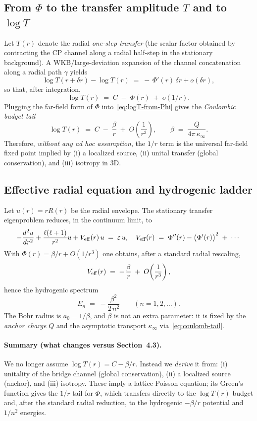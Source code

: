\documentclass[11pt]{article}
\theoremstyle{plain}
\theoremstyle{definition}
\begin{document}
\subsection{From $\Phi$ to the transfer amplitude $T$ and to \(\log T\)}
Let $T(r)$ denote the radial \emph{one-step transfer} (the scalar factor obtained by contracting the CP channel along a radial half-step in the stationary background).
A WKB/large-deviation expansion of the channel concatenation along a radial path $\gamma$ yields
\[
  \log T(r+\delta r) - \log T(r) \;=\; -\,\Phi'(r)\,\delta r + o(\delta r),
\]
so that, after integration,
\begin{equation}\label{eq:logT-from-Phi}
  \log T(r) \;=\; C \;-\; \Phi(r) \;+\; o(1/r).
\end{equation}
Plugging the far-field form of $\Phi$ into~\eqref{eq:logT-from-Phi} gives the \emph{Coulombic budget tail}
\begin{equation}\label{eq:coulomb-tail}
  \log T(r) \;=\; C \;-\; \frac{\beta}{r} \;+\; O\!\left(\frac{1}{r^3}\right), \qquad
  \beta \;=\; \frac{Q}{4\pi\,\kappa_\infty}.
\end{equation}
Therefore, \emph{without any ad hoc assumption}, the $1/r$ term is the universal far-field fixed point implied by (i) a localized source, (ii) unital transfer (global conservation), and (iii) isotropy in 3D.

\subsection{Effective radial equation and hydrogenic ladder}
Let $u(r)=rR(r)$ be the radial envelope. The stationary transfer eigenproblem reduces, in the continuum limit, to
\[
  -\frac{d^2u}{dr^2} + \frac{\ell(\ell+1)}{r^2} u + V_{\rm eff}(r)\,u \;=\; \varepsilon\,u,
  \quad
  V_{\rm eff}(r)\;=\; \Phi''(r) - \big(\Phi'(r)\big)^2 \;+\; \cdots
\]
With $\Phi(r)= \beta/r + O(1/r^3)$ one obtains, after a standard radial rescaling,
\[
  V_{\rm eff}(r) \;=\; -\,\frac{\beta}{r} \;+\; O\!\left(\frac{1}{r^3}\right),
\]
hence the hydrogenic spectrum
\[
  E_n \;=\; -\frac{\beta^2}{2\,n^2} \qquad (n=1,2,\ldots).
\]
The Bohr radius is $a_0=1/\beta$, and \(\beta\) is not an extra parameter: it is fixed by the \emph{anchor charge} \(Q\) and the asymptotic transport \(\kappa_\infty\) via~\eqref{eq:coulomb-tail}.

\paragraph{Summary (what changes versus Section~4.3).}
We no longer assume $\log T(r)=C-\beta/r$.
Instead we \emph{derive} it from: (i) unitality of the bridge channel (global conservation), (ii) a localized source (anchor), and (iii) isotropy.
These imply a lattice Poisson equation; its Green’s function gives the $1/r$ tail for $\Phi$, which transfers directly to the \(\log T(r)\) budget and, after the standard radial reduction, to the hydrogenic \(-\beta/r\) potential and \(1/n^2\) energies.
\end{document}
